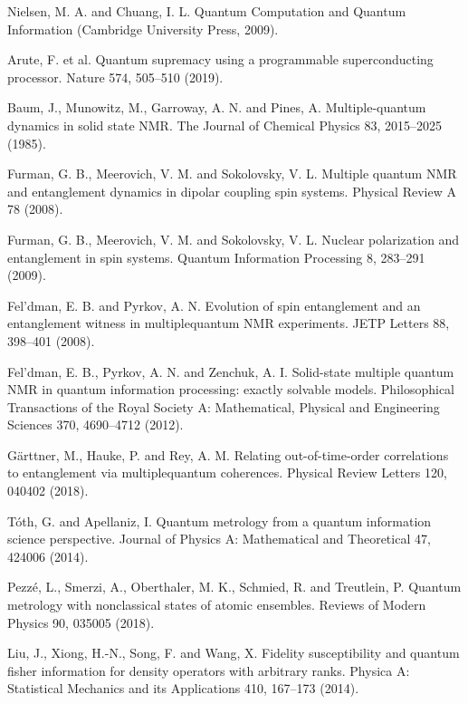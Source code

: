 \documentclass[utf8]{jetp}
\begin{document}
\begin{thebibliography}{35}
Nielsen, M. A. and  Chuang, I. L. Quantum Computation and Quantum Information (Cambridge University Press, 2009).

Arute, F. et al. Quantum supremacy using a programmable superconducting processor. Nature 574,
505–510 (2019).

Baum, J., Munowitz, M., Garroway, A. N. and  Pines, A. Multiple-quantum dynamics in solid state NMR. The Journal of Chemical Physics 83, 2015–2025 (1985).

Furman, G. B., Meerovich, V. M. and  Sokolovsky, V. L. Multiple quantum NMR and entanglement dynamics in dipolar coupling spin systems. Physical Review A 78 (2008).

Furman, G. B., Meerovich, V. M. and  Sokolovsky, V. L. Nuclear polarization and entanglement in spin systems. Quantum Information Processing 8, 283–291 (2009).

Fel’dman, E. B. and  Pyrkov, A. N. Evolution of spin entanglement and an entanglement witness in multiplequantum NMR experiments. JETP Letters 88, 398–401 (2008). 

Fel'dman, E. B., Pyrkov, A. N. and  Zenchuk, A. I. Solid-state multiple quantum NMR in quantum information processing: exactly solvable models. Philosophical Transactions of the Royal Society A: Mathematical, Physical and Engineering Sciences 370, 4690–4712 (2012).

G\"arttner, M., Hauke, P. and  Rey, A. M. Relating out-of-time-order correlations to entanglement via multiplequantum coherences. Physical Review Letters 120, 040402 (2018).

T\'oth, G. and  Apellaniz, I. Quantum metrology from a quantum information science perspective. Journal of
Physics A: Mathematical and Theoretical 47, 424006 (2014).

Pezz\'e, L., Smerzi, A., Oberthaler, M. K., Schmied, R. and  Treutlein, P. Quantum metrology with nonclassical states of atomic ensembles. Reviews of Modern Physics 90, 035005 (2018).

Liu, J., Xiong, H.-N., Song, F. and  Wang, X. Fidelity susceptibility and quantum fisher information for
density operators with arbitrary ranks. Physica A: Statistical Mechanics and its Applications 410, 167–173 (2014).


\end{thebibliography}
\end{document}
